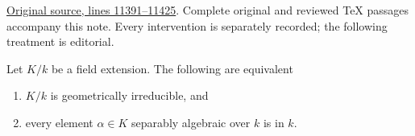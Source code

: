 \noindent\href{https://github.com/stacks/stacks-project/blob/a04446e57ec1fbc252a871afcec7752fb2807b14/algebra.tex\#L11391}{Original source, lines 11391--11425}. Complete original and reviewed TeX passages accompany this note. Every intervention is separately recorded; the following treatment is editorial.


\begin{lemma}
\label{editorial-source-lemma-geometrically-irreducible-separable-elements}
Let $K/k$ be a field extension. The following are equivalent
\begin{enumerate}
\item $K/k$ is geometrically irreducible, and
\item every element $\alpha \in K$ separably algebraic over $k$ is
in $k$.
\end{enumerate}
\end{lemma}

